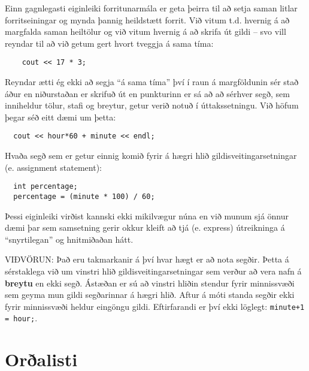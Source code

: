 Einn gagnlegasti eiginleiki forritunarmála er geta þeirra til að setja saman litlar forritseiningar og mynda þannig heildstætt forrit.
Við vitum t.d. hvernig á að margfalda saman heiltölur og við vitum hvernig á að skrifa út gildi -- svo vill reyndar til að við getum gert hvort tveggja á sama tíma:

\begin{verbatim}
    cout << 17 * 3;
\end{verbatim}
%
Reyndar ætti ég ekki að segja ``á sama tíma'' því í raun á margföldunin sér stað áður en niðurstaðan er skrifuð út 
en punkturinn er sá að að sérhver segð, sem inniheldur tölur, stafi og breytur, getur verið notuð í úttakssetningu.
Við höfum þegar séð eitt dæmi um þetta:

\begin{verbatim}
  cout << hour*60 + minute << endl;
\end{verbatim}
%
Hvaða segð sem er getur einnig komið fyrir á hægri hlið gildisveitingarsetningar (e. assignment statement): 

\begin{verbatim}
  int percentage;
  percentage = (minute * 100) / 60;
\end{verbatim}
%
Þessi eiginleiki virðist kannski ekki mikilvægur núna en við munum sjá önnur dæmi þar sem samsetning gerir okkur kleift að tjá (e. express) útreikninga á ``snyrtilegan'' og hnitmiðaðan hátt.

VIÐVÖRUN: 
Það eru takmarkanir á því hvar hægt er að nota segðir.
Þetta á sérstaklega við um vinstri hlið gildisveitingarsetningar sem verður að vera nafn á {\bf breytu} en ekki segð.
Ástæðan er sú að vinstri hliðin stendur fyrir minnissvæði sem geyma mun gildi segðarinnar á hægri hlið.
Aftur á móti standa segðir ekki fyrir minnissvæði heldur eingöngu gildi.
Eftirfarandi er því ekki löglegt: {\tt minute+1 = hour;}.

\section{Orðalisti}


